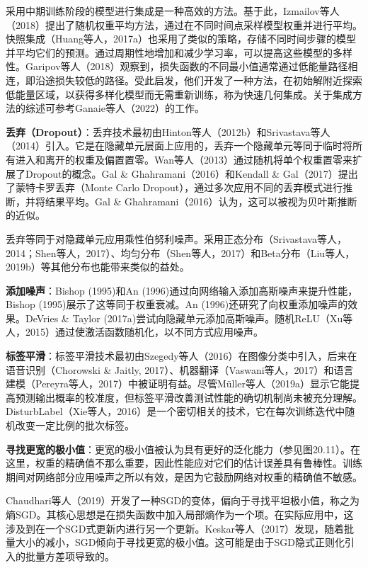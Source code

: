 \documentclass[lang=cn,newtx,10pt,scheme=chinese]{elegantbook}
\begin{document}
采用中期训练阶段的模型进行集成是一种高效的方法。基于此，Izmailov等人（2018）提出了随机权重平均方法，通过在不同时间点采样模型权重并进行平均。快照集成（Huang等人，2017a）也采用了类似的策略，存储不同时间步骤的模型并平均它们的预测。通过周期性地增加和减少学习率，可以提高这些模型的多样性。Garipov等人（2018）观察到，损失函数的不同最小值通常通过低能量路径相连，即沿途损失较低的路径。受此启发，他们开发了一种方法，在初始解附近探索低能量区域，以获得多样化模型而无需重新训练，称为快速几何集成。关于集成方法的综述可参考Ganaie等人（2022）的工作。

\textbf{丢弃（Dropout）}：丢弃技术最初由Hinton等人（2012b）和Srivastava等人（2014）引入。它是在隐藏单元层面上应用的，丢弃一个隐藏单元等同于临时将所有进入和离开的权重及偏置置零。Wan等人（2013）通过随机将单个权重置零来扩展了Dropout的概念。Gal \& Ghahramani（2016）和Kendall \& Gal（2017）提出了蒙特卡罗丢弃（Monte Carlo Dropout），通过多次应用不同的丢弃模式进行推断，并将结果平均。Gal \& Ghahramani（2016）认为，这可以被视为贝叶斯推断的近似。

丢弃等同于对隐藏单元应用乘性伯努利噪声。采用正态分布（Srivastava等人，2014；Shen等人，2017）、均匀分布（Shen等人，2017）和Beta分布（Liu等人，2019b）等其他分布也能带来类似的益处。

\textbf{添加噪声}：Bishop (1995)和An (1996)通过向网络输入添加高斯噪声来提升性能，Bishop (1995)展示了这等同于权重衰减。An (1996)还研究了向权重添加噪声的效果。DeVries \& Taylor (2017a)尝试向隐藏单元添加高斯噪声。随机ReLU（Xu等人，2015）通过使激活函数随机化，以不同方式应用噪声。

\textbf{标签平滑}：标签平滑技术最初由Szegedy等人（2016）在图像分类中引入，后来在语音识别（Chorowski \& Jaitly, 2017）、机器翻译（Vaswani等人，2017）和语言建模（Pereyra等人，2017）中被证明有益。尽管Müller等人（2019a）显示它能提高预测输出概率的校准度，但标签平滑改善测试性能的确切机制尚未被充分理解。DisturbLabel（Xie等人，2016）是一个密切相关的技术，它在每次训练迭代中随机改变一定比例的批次标签。

\textbf{寻找更宽的极小值}：更宽的极小值被认为具有更好的泛化能力（参见图20.11）。在这里，权重的精确值不那么重要，因此性能应对它们的估计误差具有鲁棒性。训练期间对网络部分应用噪声之所以有效，是因为它鼓励网络对权重的精确值不敏感。

Chaudhari等人（2019）开发了一种SGD的变体，偏向于寻找平坦极小值，称之为熵SGD。其核心思想是在损失函数中加入局部熵作为一个项。在实际应用中，这涉及到在一个SGD式更新内进行另一个更新。Keskar等人（2017）发现，随着批量大小的减小，SGD倾向于寻找更宽的极小值。这可能是由于SGD隐式正则化引入的批量方差项导致的。
\end{document}
